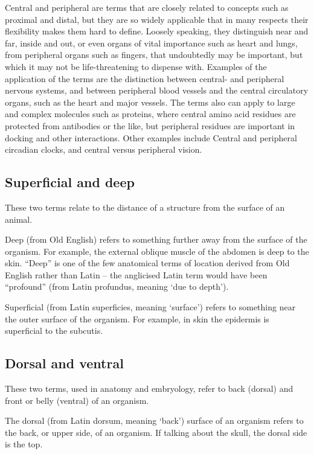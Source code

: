 Central and peripheral are terms that are closely related to concepts such as proximal and distal, but they are so widely applicable that in many respects their flexibility makes them hard to define. Loosely speaking, they distinguish near and far, inside and out, or even organs of vital importance such as heart and lungs, from peripheral organs such as fingers, that undoubtedly may be important, but which it may not be life-threatening to dispense with. Examples of the application of the terms are the distinction between central- and peripheral nervous systems, and between peripheral blood vessels and the central circulatory organs, such as the heart and major vessels. The terms also can apply to large and complex molecules such as proteins, where central amino acid residues are protected from antibodies or the like, but peripheral residues are important in docking and other interactions. Other examples include Central and peripheral circadian clocks, and central versus peripheral vision.

\hypertarget{superficial-and-deep}{%
\subsection{Superficial and deep}\label{superficial-and-deep}}

These two terms relate to the distance of a structure from the surface of an animal.

Deep (from Old English) refers to something further away from the surface of the organism. For example, the external oblique muscle of the abdomen is deep to the skin. ``Deep'' is one of the few anatomical terms of location derived from Old English rather than Latin -- the anglicised Latin term would have been ``profound'' (from Latin profundus, meaning `due to depth').

Superficial (from Latin superficies, meaning `surface') refers to something near the outer surface of the organism. For example, in skin the epidermis is superficial to the subcutis.

\hypertarget{dorsal-and-ventral}{%
\subsection{Dorsal and ventral}\label{dorsal-and-ventral}}

These two terms, used in anatomy and embryology, refer to back (dorsal) and front or belly (ventral) of an organism.

The dorsal (from Latin dorsum, meaning `back') surface of an organism refers to the back, or upper side, of an organism. If talking about the skull, the dorsal side is the top.

